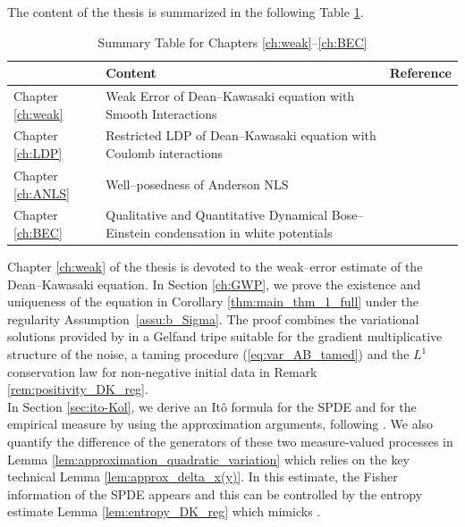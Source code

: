 The content of the thesis is summarized in the following Table \ref{table:thesis-content}.
{
\renewcommand{\arraystretch}{1.6}
\begin{table}[h!]
\centering
\begin{tabular}{|>{\centering\arraybackslash}m{2cm}|>{\centering\arraybackslash}m{9cm}|>{\centering\arraybackslash}m{2cm}|}
\hline
 & Content & Reference \\
\hline
Chapter \ref{ch:weak} & Weak Error of Dean--Kawasaki equation with Smooth Interactions & \cite{djurdjevac2025weak} \\
\hline
Chapter \ref{ch:LDP} & Restricted LDP of Dean--Kawasaki equation with Coulomb interactions  & \cite{ji2025regularizedDeanKawasaki} \\
\hline
Chapter \ref{ch:ANLS} & Well--posedness of Anderson NLS & \cite{de2025stochastic}  \\
\hline
Chapter \ref{ch:BEC} & Qualitative and Quantitative Dynamical Bose--Einstein condensation in white potentials & \cite{de2025stochastic,zachhuber2025meanfield} \\
\hline
\end{tabular}
\caption{Summary Table for Chapters \ref{ch:weak}--\ref{ch:BEC}}
\label{table:thesis-content}
\end{table}}

Chapter \ref{ch:weak} of the thesis is devoted to the weak--error estimate of the Dean--Kawasaki equation. In Section \ref{ch:GWP}, we prove the existence and uniqueness of the equation in Corollary \ref{thm:main_thm_1_full} under the regularity Assumption~\ref{assu:b_Sigma}. The proof combines the variational solutions provided by \cite{RSZ22} in a Gelfand tripe suitable for the gradient multiplicative structure of the noise, a taming procedure (\ref{eq:var_AB_tamed}) and the $L^1$ conservation law for non-negative initial data in Remark \ref{rem:positivity_DK_reg}.\\

In Section \ref{sec:ito-Kol}, we derive an It\^o formula for the SPDE and for the empirical measure by using the approximation arguments, following \cite{CD22}. We also quantify the difference of the generators of these two measure-valued processes in Lemma \ref{lem:approximation_quadratic_variation} which relies on the key technical Lemma \ref{lem:approx_delta_x(y)}. In this estimate, the Fisher information of the SPDE appears and this can be controlled by the entropy estimate Lemma \ref{lem:entropy_DK_reg} which mimicks \cite{FG21}. \\

